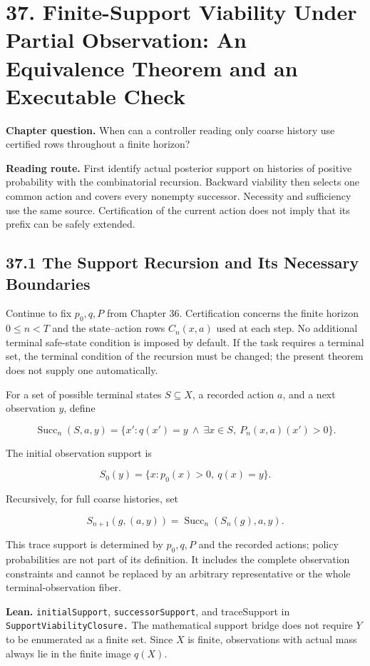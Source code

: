 \documentclass[
  english,
  11pt,
  oneside]{book}
\newcounter{none} %
\begin{document}
\chapter{37. Finite-Support Viability Under Partial Observation: An Equivalence Theorem and an Executable Check}\label{ch-37}

\textbf{Chapter question.} When can a controller reading only coarse history use certified rows throughout a finite horizon?

\textbf{Reading route.} First identify actual posterior support on histories of positive probability with the combinatorial recursion. Backward viability then selects one common action and covers every nonempty successor. Necessity and sufficiency use the same source. Certification of the current action does not imply that its prefix can be safely extended.

\section{37.1 The Support Recursion and Its Necessary Boundaries}\label{the-support-recursion-and-its-necessary-boundaries}

Continue to fix \(p_0,q,P\) from Chapter 36. Certification concerns the finite horizon \(0\le n<T\) and the state--action rows \(C_n(x,a)\) used at each step. No additional terminal safe-state condition is imposed by default. If the task requires a terminal set, the terminal condition of the recursion must be changed; the present theorem does not supply one automatically.

For a set of possible terminal states \(S\subseteq X\), a recorded action \(a\), and a next observation \(y\), define

\[\operatorname{Succ}_n(S,a,y)=
\{x':q(x')=y\ \land\
\exists x\in S,\ P_n(x,a)(x')>0\}.\]

The initial observation support is

\[S_0(y)=\{x:p_0(x)>0,\ q(x)=y\}.\]

Recursively, for full coarse histories, set

\[S_{n+1}(g,(a,y))=\operatorname{Succ}_n(S_n(g),a,y).\]

This trace support is determined by \(p_0,q,P\) and the recorded actions; policy probabilities are not part of its definition. It includes the complete observation constraints and cannot be replaced by an arbitrary representative or the whole terminal-observation fiber.

\textbf{Lean.} \nolinkurl{initialSupport}, \nolinkurl{successorSupport}, and traceSupport in \nolinkurl{SupportViabilityClosure.} The mathematical support bridge does not require \(Y\) to be enumerated as a finite set. Since \(X\) is finite, observations with actual mass always lie in the finite image \(q(X)\).
\end{document}
